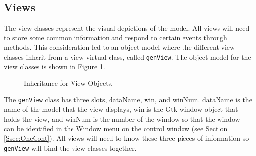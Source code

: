 \documentclass{article}[11pt]
\newcommand{\Robject}[1]{{\texttt{#1}}}
\begin{document}
\subsection{Views}\label{Ssec:OneViews}

The view classes represent the visual depictions of the model.  All views will
need to store some common information and respond to certain events through
methods.  This consideration led to an object model where the different view
classes inherit from a view virtual class, called \Robject{genView}.  The
object model for the view classes is shown in Figure \ref{Fig:View}.

\begin{figure}[ht]
  \begin{center}
    \caption{ Inheritance for View Objects. }
    \label{Fig:View}
  \end{center}
\end{figure}

The \Robject{genView} class has three slots, dataName, win, and winNum.
dataName is the name of the model that the view displays, win is the Gtk
window object that holds the view, and winNum is the number of the window so
that the window can be identified in the Window menu on the control window
(see Section \ref{Ssec:OneCont}).  All views will need to know these three
pieces of information so \Robject{genView} will bind the view classes
together. 
\end{document}
